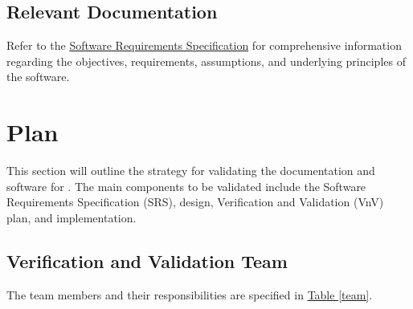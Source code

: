 \documentclass[12pt, titlepage]{article}
\begin{document}
\subsection{Relevant Documentation}

Refer to the 
\href{https://github.com/mirzaim/ipcs/blob/main/docs/SRS/SRS.pdf}{Software 
Requirements Specification} for comprehensive information regarding 
the objectives, requirements, assumptions, and underlying 
principles of the software.




\section{Plan}

This section will outline the strategy for validating the documentation 
and software for \progname{}. The main components to be validated 
include the Software Requirements Specification (SRS), design, 
Verification and Validation (VnV) plan, and implementation.



\subsection{Verification and Validation Team}

The team members and their responsibilities are specified in \hyperref[team]{Table \ref*{team}}.
\end{document}
